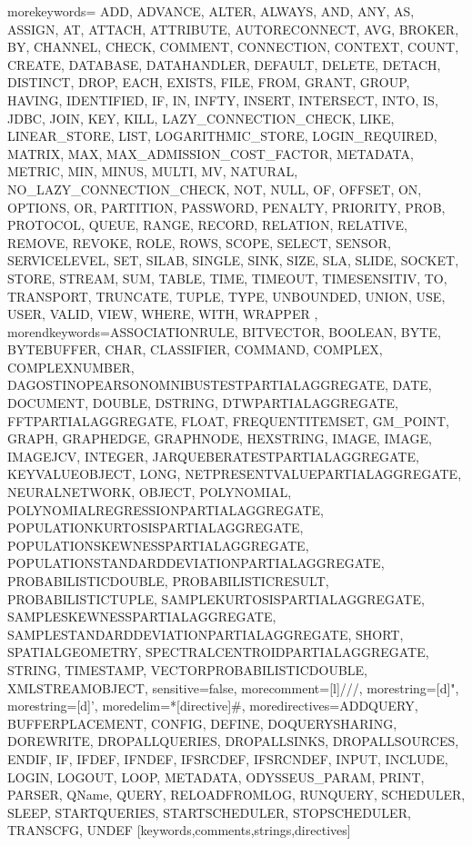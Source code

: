 %
   {morekeywords={%
ADD, ADVANCE, ALTER, ALWAYS, AND, ANY, AS, ASSIGN, AT, ATTACH, ATTRIBUTE, AUTORECONNECT, AVG, BROKER, BY, CHANNEL, CHECK, COMMENT, CONNECTION, CONTEXT, COUNT, CREATE, DATABASE, DATAHANDLER, DEFAULT, DELETE, DETACH, DISTINCT, DROP, EACH, EXISTS, FILE, FROM, GRANT, GROUP, HAVING, IDENTIFIED, IF, IN, INFTY, INSERT, INTERSECT, INTO, IS, JDBC, JOIN, KEY, KILL, LAZY_CONNECTION_CHECK, LIKE, LINEAR_STORE, LIST, LOGARITHMIC_STORE, LOGIN_REQUIRED, MATRIX, MAX, MAX_ADMISSION_COST_FACTOR, METADATA, METRIC, MIN, MINUS, MULTI, MV, NATURAL, NO_LAZY_CONNECTION_CHECK, NOT, NULL, OF, OFFSET, ON, OPTIONS, OR, PARTITION, PASSWORD, PENALTY, PRIORITY, PROB, PROTOCOL, QUEUE, RANGE, RECORD, RELATION, RELATIVE, REMOVE, REVOKE, ROLE, ROWS, SCOPE, SELECT, SENSOR, SERVICELEVEL, SET, SILAB, SINGLE, SINK, SIZE, SLA, SLIDE, SOCKET, STORE, STREAM, SUM, TABLE, TIME, TIMEOUT, TIMESENSITIV, TO, TRANSPORT, TRUNCATE, TUPLE, TYPE, UNBOUNDED, UNION, USE, USER, VALID, VIEW, WHERE, WITH, WRAPPER%
      },%
   morendkeywords={ASSOCIATIONRULE, BITVECTOR, BOOLEAN, BYTE, BYTEBUFFER, CHAR, CLASSIFIER, COMMAND, COMPLEX, COMPLEXNUMBER, DAGOSTINOPEARSONOMNIBUSTESTPARTIALAGGREGATE, DATE, DOCUMENT, DOUBLE, DSTRING, DTWPARTIALAGGREGATE, FFTPARTIALAGGREGATE, FLOAT, FREQUENTITEMSET, GM_POINT, GRAPH, GRAPHEDGE, GRAPHNODE, HEXSTRING, IMAGE, IMAGE, IMAGEJCV, INTEGER, JARQUEBERATESTPARTIALAGGREGATE, KEYVALUEOBJECT, LONG, NETPRESENTVALUEPARTIALAGGREGATE, NEURALNETWORK, OBJECT, POLYNOMIAL, POLYNOMIALREGRESSIONPARTIALAGGREGATE, POPULATIONKURTOSISPARTIALAGGREGATE, POPULATIONSKEWNESSPARTIALAGGREGATE, POPULATIONSTANDARDDEVIATIONPARTIALAGGREGATE, PROBABILISTICDOUBLE, PROBABILISTICRESULT, PROBABILISTICTUPLE, SAMPLEKURTOSISPARTIALAGGREGATE, SAMPLESKEWNESSPARTIALAGGREGATE, SAMPLESTANDARDDEVIATIONPARTIALAGGREGATE, SHORT, SPATIALGEOMETRY, SPECTRALCENTROIDPARTIALAGGREGATE, STRING, TIMESTAMP, VECTORPROBABILISTICDOUBLE, XMLSTREAMOBJECT},%
   sensitive=false,
   morecomment=[l]///,%
   morestring=[d]",%
   morestring=[d]',%
   moredelim=*[directive]\#,%
   moredirectives={ADDQUERY, BUFFERPLACEMENT, CONFIG, DEFINE, DOQUERYSHARING, DOREWRITE, DROPALLQUERIES, DROPALLSINKS, DROPALLSOURCES, ENDIF, IF, IFDEF, IFNDEF, IFSRCDEF, IFSRCNDEF, INPUT, INCLUDE, LOGIN, LOGOUT, LOOP, METADATA, ODYSSEUS_PARAM, PRINT, PARSER, QName, QUERY, RELOADFROMLOG, RUNQUERY, SCHEDULER, SLEEP, STARTQUERIES, STARTSCHEDULER, STOPSCHEDULER, TRANSCFG, UNDEF}%
}[keywords,comments,strings,directives]

